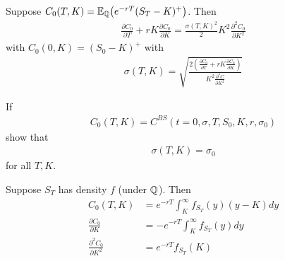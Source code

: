\begin{thm}[Dupire]
  \label{defn:market_models:3}
  Suppose $C_{0}(T, K) = \E{e^{-rT}(S_{T} - K)^{+}}{\Q}$.  Then
  \begin{align}
    \label{eq:103}
    \frac{\partial C_{0}}{\partial T} + rK \frac{\partial
      C_{0}}{\partial K} = \frac{\sigma(T, K)^{2}}{2} K^{2}
    \frac{\partial^{2} C_{0}}{\partial K^{2}}
  \end{align} with $C_{0}(0, K) = (S_{0} - K)^{+}$ with
  \begin{align}
    \label{eq:104}
    \sigma(T, K) = \sqrt{\frac{2(\frac{\partial C_{0}}{\partial T} +
        rK \frac{\partial C_{0}}{\partial K})}{K^{2}
        \frac{\partial^{2} C}{\partial K^{2}}}}
  \end{align}
\end{thm}

\begin{exer}
  If
  \begin{align}
    \label{eq:105}
    C_{0}(T, K) = C^{BS}(t = 0, \sigma, T, S_{0}, K, r, \sigma_{0})
  \end{align}
  show that
  \begin{align}
    \label{eq:106}
    \sigma(T, K) = \sigma_{0} 
  \end{align} for all $T, K$.
\end{exer}



\begin{lem}
  Suppose $S_{T}$ has density $f$ (under $\Q$). Then
  \begin{align}
    \label{eq:107}
    C_{0}(T, K) &= e^{-rT} \int_{K}^{\infty} f_{S_{T}}(y)(y-K) dy \\
    \frac{\partial C_{0}}{\partial K} &= -e^{-rT} \int_{K}^{\infty}
    f_{S_{T}}(y) dy \\
    \frac{\partial^{2} C_{0}}{\partial K^{2}} &= e^{-rT} f_{S_{T}}(K)
  \end{align}
\end{lem}

